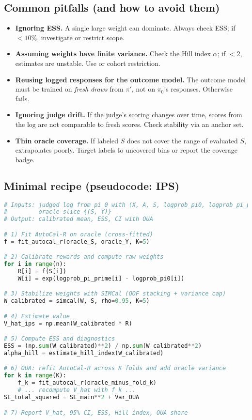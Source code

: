 \subsection{Common pitfalls (and how to avoid them)}

\begin{itemize}
\item \textbf{Ignoring ESS.} A single large weight can dominate. Always check ESS; if $< 10\%$, investigate or restrict scope.

\item \textbf{Assuming weights have finite variance.} Check the Hill index $\alpha$; if $< 2$, estimates are unstable. Use \simcal{} or cohort restriction.

\item \textbf{Reusing logged responses for the outcome model.} The outcome model must be trained on \emph{fresh draws} from $\pi'$, not on $\pi_0$'s responses. Otherwise \dr{} fails.

\item \textbf{Ignoring judge drift.} If the judge's scoring changes over time, scores from the log are not comparable to fresh scores. Check stability via an anchor set.

\item \textbf{Thin oracle coverage.} If labeled $S$ does not cover the range of evaluated $S$, \autocal{} extrapolates poorly. Target labels to uncovered bins or report the coverage badge.
\end{itemize}

\subsection{Minimal recipe (pseudocode: IPS)}

\begin{lstlisting}[language=Python,caption=Calibrated IPS Recipe]
# Inputs: judged log from pi_0 with (X, A, S, logprob_pi0, logprob_pi_prime)
#         oracle slice {(S, Y)}
# Output: calibrated mean, ESS, CI with OUA

# 1) Fit AutoCal-R on oracle (cross-fitted)
f = fit_autocal_r(oracle_S, oracle_Y, K=5)

# 2) Calibrate rewards and compute raw weights
for i in range(n):
    R[i] = f(S[i])
    W[i] = exp(logprob_pi_prime[i] - logprob_pi0[i])

# 3) Stabilize weights with SIMCal (OOF stacking + variance cap)
W_calibrated = simcal(W, S, rho=0.95, K=5)

# 4) Estimate value
V_hat_ips = np.mean(W_calibrated * R)

# 5) Compute ESS and diagnostics
ESS = (np.sum(W_calibrated)**2) / np.sum(W_calibrated**2)
alpha_hill = estimate_hill_index(W_calibrated)

# 6) OUA: refit AutoCal-R across K folds and add oracle variance
for k in range(K):
    f_k = fit_autocal_r(oracle_minus_fold_k)
    # ... recompute V_hat with f_k ...
SE_total_squared = SE_main**2 + Var_OUA

# 7) Report V_hat, 95% CI, ESS, Hill index, OUA share
\end{lstlisting}

